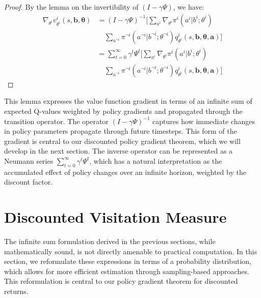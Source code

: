 \documentclass[a4paper,12pt]{report}
\begin{document}
\begin{proof}
    By the lemma on the invertibility of $(I - \gamma \Psi)$, we have:
    \begin{align}
        \nabla_{\theta^i}v^{i}_{\theta^i}(s, \boldsymbol{b}, \boldsymbol{\theta}) & = (I - \gamma \Psi)^{-1}\Bigg[\sum_{a^i}\nabla_{\theta^i}\pi^{i}(a^{i}|b^{i}; \theta^{i}) \nonumber                                                        \\
                                                                                  & \quad \sum_{a^{\neg i}}\pi^{\neg i}(a^{\neg i}|b^{\neg i}; \theta^{\neg i}) q^{i}_{\theta^i}(s, \boldsymbol{b}, \boldsymbol{\theta}, \boldsymbol{a})\Bigg] \\
                                                                                  & = \sum_{t=0}^{\infty}\gamma^{t} \Psi^{t}\Bigg[\sum_{a^i}\nabla_{\theta^i}\pi^{i}(a^{i}|b^{i}; \theta^{i}) \nonumber                                        \\
                                                                                  & \quad \sum_{a^{\neg i}}\pi^{\neg i}(a^{\neg i}|b^{\neg i}; \theta^{\neg i}) q^{i}_{\theta^i}(s, \boldsymbol{b}, \boldsymbol{\theta}, \boldsymbol{a})\Bigg]
    \end{align}
\end{proof}This lemma expresses the value function gradient in terms of an
infinite sum of expected Q-values weighted by policy gradients and propagated
through the transition operator. The operator $(I - \gamma \Psi)^{-1}$ captures how
immediate changes in policy parameters propagate through future timesteps. This
form of the gradient is central to our discounted policy gradient theorem, which
we will develop in the next section. The inverse operator can be represented as
a Neumann series $\sum_{t=0}^{\infty}\gamma^{t} \Psi^{t}$, which has a natural interpretation
as the accumulated effect of policy changes over an infinite horizon, weighted
by the discount factor.
\section{Discounted Visitation Measure}
The infinite sum formulation derived in the previous sections, while
mathematically sound, is not directly amenable to practical computation. In this
section, we reformulate these expressions in terms of a probability distribution,
which allows for more efficient estimation through sampling-based approaches. This
reformulation is central to our policy gradient theorem for discounted returns.
\end{document}
